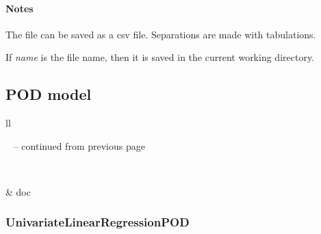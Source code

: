 \documentclass[letterpaper,10pt,english]{sphinxmanual}
\begin{document}
\begin{fulllineitems}
\begin{fulllineitems}
\begin{quote}
\begin{description}
\end{description}\end{quote}
\paragraph{Notes}

The file can be saved as a csv file. Separations are made with tabulations.

If \emph{name} is the file name, then it is saved in the current working
directory.

\end{fulllineitems}


\end{fulllineitems}



\subsection{POD model}
\label{user_manual:pod-model}
\begin{longtable}{ll}
\hline
\endfirsthead

%
{{\textsf{\tablename\ \thetable{} -- continued from previous page}}} \\
\hline
\endhead

\hline {} \\ \hline
\endfoot

\endlastfoot


{\hyperref[_generated/otpod.UnivariateLinearRegressionPOD:otpod.UnivariateLinearRegressionPOD]{\emph{}}}
 & 
doc
\\
\hline\end{longtable}



\subsubsection{UnivariateLinearRegressionPOD}
\label{_generated/otpod.UnivariateLinearRegressionPOD:univariatelinearregressionpod}\label{_generated/otpod.UnivariateLinearRegressionPOD::doc}
\end{document}
